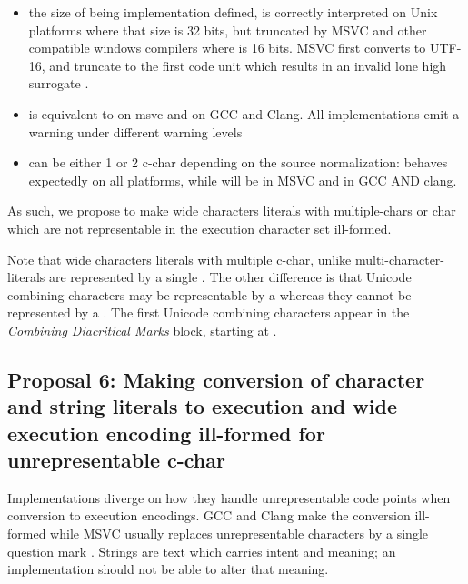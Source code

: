 \documentclass{wg21}
\newcommand{\UnicodeLetter}[1]{\textbf{\textcolor{BrickRed}{\Large\tcode{#1}}}}
\begin{document}
\begin{itemize}
\item the size of  being implementation defined,  is correctly interpreted on Unix platforms where that size is 32 bits, but truncated by MSVC and other compatible windows compilers where  is 16 bits.
MSVC first converts to UTF-16, and truncate to the first code unit which results in an invalid lone high surrogate .


\item  {} is equivalent to  on msvc and   on GCC and Clang. All implementations emit a warning under different warning levels

\item {} can be either 1 or 2 c-char depending on the source normalization:  behaves expectedly on all platforms,
while   will be  in MSVC and  in GCC AND clang.

\end{itemize}

As such, we propose to make wide characters literals with multiple-chars or char which are not representable in the execution character set ill-formed.

Note that wide characters literals with multiple c-char, unlike multi-character-literals are represented by a single .
The other difference is that Unicode combining characters may be representable by a  whereas they cannot be represented by a .
The first Unicode combining characters appear in the \emph{Combining Diacritical Marks} block, starting at .


\subsection{Proposal 6: Making conversion of character and string literals to execution and wide execution encoding ill-formed for unrepresentable c-char}

Implementations diverge on how they handle unrepresentable code points when conversion to execution encodings.
GCC and Clang make the conversion ill-formed while MSVC usually replaces unrepresentable characters by a single question mark \UnicodeLetter{?}.
Strings are text which carries intent and meaning; an implementation should not be able to alter that meaning.
\end{document}
